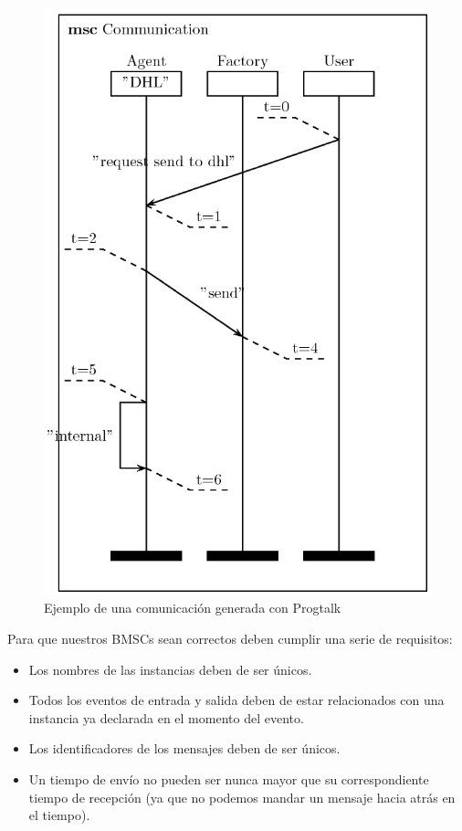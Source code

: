 \documentclass[12pt,a4paper]{report}
\begin{document}
\begin{figure}
  \centering
  \includegraphics[scale=0.5]{./images/fig1.png}
  \caption{Ejemplo de una comunicación generada con Progtalk}
  \label{fig:fig1}
\end{figure}

Para que nuestros BMSCs sean correctos deben cumplir una serie de requisitos:
\begin{itemize}
\item Los nombres de las instancias deben de ser únicos.
\item Todos los eventos de entrada y salida deben de estar relacionados con una instancia ya declarada en el momento del evento.
\item Los identificadores de los mensajes deben de ser únicos.
\item Un tiempo de envío no pueden ser nunca mayor que su correspondiente tiempo de recepción (ya que no podemos mandar un mensaje hacia atrás en el tiempo).
\end{itemize}
\end{document}
